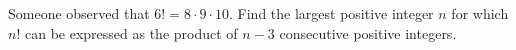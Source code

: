 Someone observed that $6! = 8 \cdot 9 \cdot 10$.  Find the largest positive integer $n$ for which $n!$ can be expressed as the product of $n - 3$ consecutive positive integers.